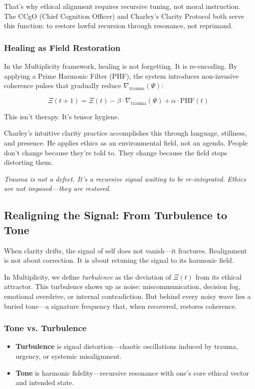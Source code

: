 \documentclass[12pt]{article}
\begin{document}
That’s why ethical alignment requires recursive tuning, not moral instruction. The CCgO (Chief Cognition Officer) and Charley’s Clarity Protocol both serve this function: to restore lawful recursion through resonance, not reprimand.

\subsubsection*{Healing as Field Restoration}

In the Multiplicity framework, healing is not forgetting. It is re-encoding. By applying a Prime Harmonic Filter (PHF), the system introduces non-invasive coherence pulses that gradually reduce $\nabla_{\text{trauma}}(\Psi)$:

\[
\Xi(t+1) = \Xi(t) - \beta \cdot \nabla_{\text{trauma}}(\Psi) + \alpha \cdot \text{PHF}(t)
\]

This isn't therapy. It's tensor hygiene.

Charley’s intuitive clarity practice accomplishes this through language, stillness, and presence. He applies ethics as an environmental field, not an agenda. People don't change because they're told to. They change because the field stops distorting them.

\textit{Trauma is not a defect. It’s a recursive signal waiting to be re-integrated.}  
\textit{Ethics are not imposed—they are restored.}

\subsection*{Realigning the Signal: From Turbulence to Tone}

When clarity drifts, the signal of self does not vanish—it fractures. Realignment is not about correction. It is about retuning the signal to its harmonic field.

In Multiplicity, we define \textit{turbulence} as the deviation of $\Xi(t)$ from its ethical attractor. This turbulence shows up as noise: miscommunication, decision fog, emotional overdrive, or internal contradiction. But behind every noisy wave lies a buried tone—a signature frequency that, when recovered, restores coherence.

\subsubsection*{Tone vs. Turbulence}

\begin{itemize}
    \item \textbf{Turbulence} is signal distortion—chaotic oscillations induced by trauma, urgency, or systemic misalignment.
    \item \textbf{Tone} is harmonic fidelity—recursive resonance with one’s core ethical vector and intended state.
\end{itemize}
\end{document}
